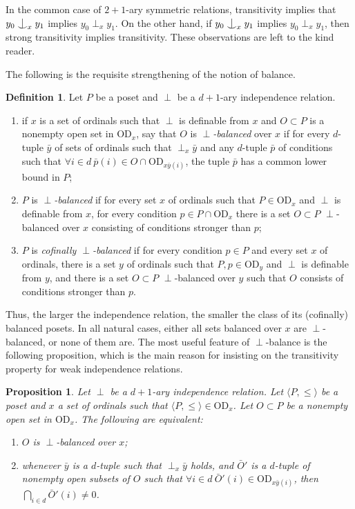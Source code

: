 \documentclass{article}
\newcommand{\vd}{\mathrm{OD}}
\newcommand{\forkindep}[1][]{%
  \mathrel{
    \mathop{
      \vcenter{
        \hbox{\oalign{\noalign{\kern-.3ex}\hfil$\vert$\hfil\cr
              \noalign{\kern-.7ex}
              $\smile$\cr\noalign{\kern-.3ex}}}
      }
    }\displaylimits_{#1}
  }
}
\newtheorem{proposition}[theorem]{Proposition}
\theoremstyle{definition}
\newtheorem{definition}[theorem]{Definition}
\begin{document}
\noindent In the common case of $2+1$-ary symmetric relations, transitivity implies that $y_0\forkindep[x]y_1$ implies $y_0\perp_xy_1$. On the other hand, if $y_0\forkindep[x]y_1$ implies $y_0\perp_xy_1$, then strong transitivity implies transitivity. These observations are left to the kind reader.

The following is the requisite strengthening of the notion of balance.

\begin{definition}
Let $P$ be a poset and $\perp$ be a $d+1$-ary independence relation.

\begin{enumerate}
\item if $x$ is a set of ordinals such that $\perp$ is definable from $x$ and $O\subset P$ is a nonempty open set in $\vd_x$, say that $O$ is \emph{$\perp$-balanced} over $x$ if for every $d$-tuple $\bar y$ of sets of ordinals such that $\perp_x\bar y$ and any $d$-tuple $\bar p$ of conditions such that $\forall i\in d\ \bar p(i)\in O\cap\vd_{x\bar y(i)}$, the tuple $\bar p$ has a common lower bound in $P$;
\item $P$ is \emph{$\perp$-balanced} if for every set $x$ of ordinals such that $P\in\vd_x$ and $\perp$ is definable from $x$, for every condition $p\in P\cap\vd_x$ there is a set $O\subset P$ $\perp$-balanced over $x$ consisting of conditions stronger than $p$;
\item $P$ is \emph{cofinally $\perp$-balanced} if for every condition $p\in P$ and every set $x$ of ordinals, there is a set $y$ of ordinals such that $P, p\in\vd_y$ and $\perp$ is definable from $y$, and there is a set $O\subset P$ $\perp$-balanced over $y$ such that $O$ consists of conditions stronger than $p$.
\end{enumerate}
\end{definition}

\noindent Thus, the larger the independence relation, the smaller the class of its (cofinally) balanced posets. In all natural cases, either all sets balanced over $x$ are $\perp$-balanced, or none of them are. The most useful feature of $\perp$-balance is the following proposition, which is the main reason for insisting on the transitivity property for weak independence relations.

\begin{proposition}
\label{extensionproposition2}
Let $\perp$ be a $d+1$-ary independence relation. Let $\langle P, \leq\rangle$ be a poset and $x$ a set of ordinals such that $\langle P, \leq\rangle\in\vd_x$. Let $O\subset P$ be a nonempty open set in $\vd_x$. The following are equivalent:

\begin{enumerate}
\item $O$ is $\perp$-balanced over $x$;
\item whenever $\bar y$ is a $d$-tuple such that $\perp_x\bar y$ holds, and $\bar O'$ is a $d$-tuple of nonempty open subsets of $O$ such that $\forall i\in d\ \bar O'(i)\in\vd_{x\bar y(i)}$, then $\bigcap_{i\in d}\bar O'(i)\neq 0$.
\end{enumerate}
\end{proposition}
\end{document}
